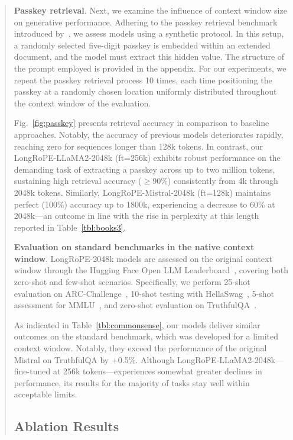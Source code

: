\begin{abstract}
\textbf{Passkey retrieval}. Next, we examine the influence of context window size on generative performance. Adhering to the passkey retrieval benchmark introduced by~\cite{passkey}, we assess models using a synthetic protocol. In this setup, a randomly selected five-digit passkey is embedded within an extended document, and the model must extract this hidden value. The structure of the prompt employed is provided in the appendix. For our experiments, we repeat the passkey retrieval process 10 times, each time positioning the passkey at a randomly chosen location uniformly distributed throughout the context window of the evaluation.

Fig.~\ref{fig:passkey} presents retrieval accuracy in comparison to baseline approaches. Notably, the accuracy of previous models deteriorates rapidly, reaching zero for sequences longer than 128k tokens. In contrast, our LongRoPE-LLaMA2-2048k (ft=256k) exhibits robust performance on the demanding task of extracting a passkey across up to two million tokens, sustaining high retrieval accuracy ($\ge$90\%) consistently from 4k through 2048k tokens. Similarly, LongRoPE-Mistral-2048k (ft=128k) maintains perfect (100\%) accuracy up to 1800k, experiencing a decrease to 60\% at 2048k—an outcome in line with the rise in perplexity at this length reported in Table~\ref{tbl:books3}.

\textbf{Evaluation on standard benchmarks in the native context window}. LongRoPE-2048k models are assessed on the original context window through the Hugging Face Open LLM Leaderboard~\cite{huggingfaceboard}, covering both zero-shot and few-shot scenarios. Specifically, we perform 25-shot evaluation on ARC-Challenge~\cite{allenai:arc}, 10-shot testing with HellaSwag~\cite{zellers2019hellaswag}, 5-shot assessment for MMLU~\cite{mmlu}, and zero-shot evaluation on TruthfulQA~\cite{lin2021truthfulqa}.

As indicated in Table~\ref{tbl:commonsense}, our models deliver similar outcomes on the standard benchmark, which was developed for a limited context window. Notably, they exceed the performance of the original Mistral on TruthfulQA by +0.5\%. Although LongRoPE-LLaMA2-2048k—fine-tuned at 256k tokens—experiences somewhat greater declines in performance, its results for the majority of tasks stay well within acceptable limits.

\subsection{Ablation Results}


\end{abstract}
